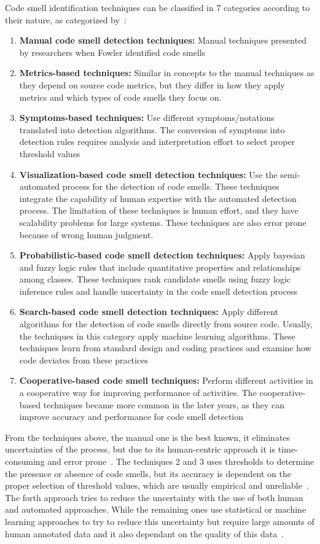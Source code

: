 Code smell identification techniques can be classified in 7 categories according to their nature, as categorized by~\citet{rasool2015review}:
\begin{enumerate}
    \item \textbf{Manual code smell detection techniques:} Manual techniques presented by researchers when Fowler identified code smells
    \item \textbf{Metrics-based techniques:} Similar in concepts to the manual techniques as they depend on source code metrics, but they differ in how they apply metrics and which types of code smells they focus on.
    \item \textbf{Symptoms-based techniques:} Use different symptoms/notations translated into detection algorithms. The conversion of symptoms into detection rules requires analysis and interpretation effort to select proper threshold values
    \item \textbf{Visualization-based code smell detection techniques:} Use the semi-automated process for the detection of code smells. These techniques integrate the capability of human expertise with the automated detection process. The limitation of these techniques is human effort, and they have scalability problems for large systems. These techniques are also error prone because of wrong human judgment.
    \item \textbf{Probabilistic-based code smell detection techniques:} Apply bayesian and fuzzy logic rules that include quantitative properties and relationships among classes. These techniques rank candidate smells using fuzzy logic inference rules and handle uncertainty in the code smell detection process
    \item \textbf{Search-based code smell detection techniques:} Apply different algorithms for the detection of code smells directly from source code. Usually, the techniques in this category apply machine learning algorithms. These techniques learn from standard design and coding practices and examine how code deviates from these practices
    \item \textbf{Cooperative-based code smell techniques:} Perform different activities in a cooperative way for improving performance of activities. The cooperative-based techniques became more common in the later years, as they can improve accuracy and performance for code smell detection
\end{enumerate}

From the techniques above, the manual one is the best known, it eliminates uncertainties of the process, but due to its human-centric approach it is time-consuming and error prone~\citep{counsell2010strategy}. The techniques 2 and 3 uses thresholds to determine the presence or absence of code smells, but its accuracy is dependent on the proper selection of threshold values, which are usually empirical and unreliable~\citep{ferme2013real}. The forth approach tries to reduce the uncertainty with the use of both human and automated approaches. While the remaining ones use statistical or machine learning approaches to try to reduce this uncertainty but require large amounts of human annotated data and it also dependant on the quality of this data~\citep{rasool2015review}.

